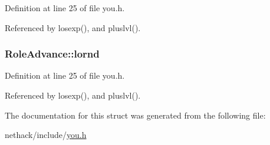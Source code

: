 Definition at line 25 of file you.\+h.



Referenced by losexp(), and pluslvl().

\hypertarget{structRoleAdvance_a1e4f4dd4e5f7aa4ee3311999d99b3f47}{
\subsubsection[{lornd}]{ Role\+Advance\+::lornd}}\label{structRoleAdvance_a1e4f4dd4e5f7aa4ee3311999d99b3f47}


Definition at line 25 of file you.\+h.



Referenced by losexp(), and pluslvl().



The documentation for this struct was generated from the following file\+:\begin{DoxyCompactItemize}
\item 
nethack/include/\hyperlink{you_8h}{you.\+h}\end{DoxyCompactItemize}
